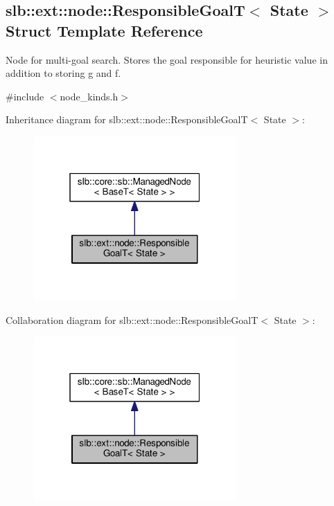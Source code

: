 \hypertarget{structslb_1_1ext_1_1node_1_1ResponsibleGoalT}{}\subsection{slb\+:\+:ext\+:\+:node\+:\+:Responsible\+GoalT$<$ State $>$ Struct Template Reference}
\label{structslb_1_1ext_1_1node_1_1ResponsibleGoalT}


Node for multi-\/goal search. Stores the goal responsible for heuristic value in addition to storing {\ttfamily g} and {\ttfamily f}.  




{\ttfamily \#include $<$node\+\_\+kinds.\+h$>$}



Inheritance diagram for slb\+:\+:ext\+:\+:node\+:\+:Responsible\+GoalT$<$ State $>$\+:\nopagebreak
\begin{figure}[H]
\begin{center}
\leavevmode
\includegraphics[width=220pt]{structslb_1_1ext_1_1node_1_1ResponsibleGoalT__inherit__graph}
\end{center}
\end{figure}


Collaboration diagram for slb\+:\+:ext\+:\+:node\+:\+:Responsible\+GoalT$<$ State $>$\+:\nopagebreak
\begin{figure}[H]
\begin{center}
\leavevmode
\includegraphics[width=220pt]{structslb_1_1ext_1_1node_1_1ResponsibleGoalT__coll__graph}
\end{center}
\end{figure}
